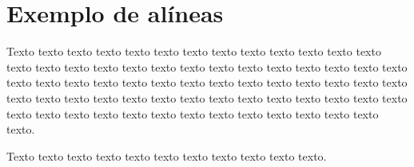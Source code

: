 
\section{Exemplo de alíneas}\label{sec:exemplo-de-algoritmos-e-figuras}

    Texto texto texto texto texto texto texto texto texto texto texto texto texto texto texto texto texto texto texto texto texto texto texto texto texto texto texto texto texto texto texto texto texto texto texto texto texto texto texto texto texto texto texto texto texto texto texto texto texto texto texto texto texto texto texto texto texto texto texto texto texto texto texto texto texto texto texto texto texto.


    Texto texto texto texto texto texto texto texto texto texto texto.



